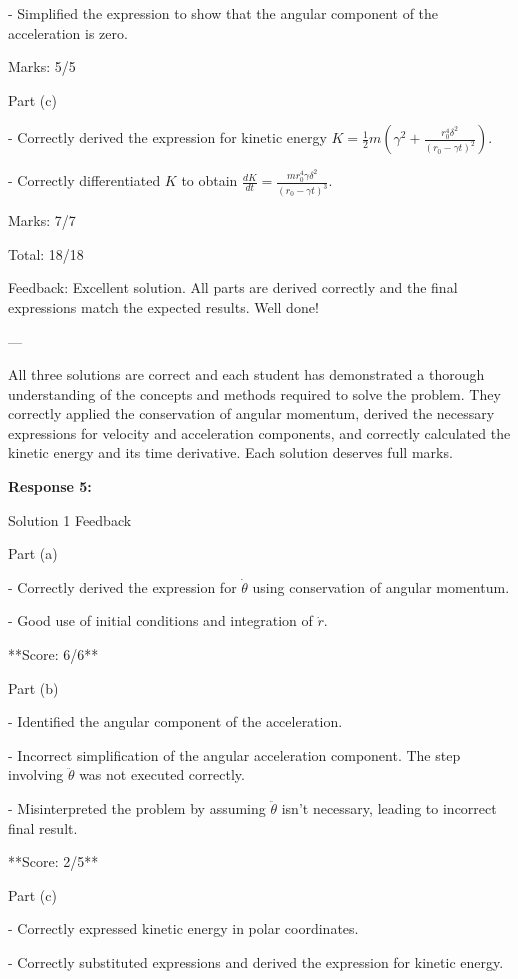 \documentclass[a4paper,11pt]{article}
\begin{document}
- Simplified the expression to show that the angular component of the acceleration is zero.

Marks: 5/5

Part (c)

- Correctly derived the expression for kinetic energy \( K = \frac{1}{2}m (\gamma^2 + \frac{r_0^4 \delta^2}{(r_0 - \gamma t)^2}) \).

- Correctly differentiated \( K \) to obtain \( \frac{dK}{dt} = \frac{m r_0^4 \gamma \delta^2}{(r_0 - \gamma t)^3} \).

Marks: 7/7

Total: 18/18

Feedback: Excellent solution. All parts are derived correctly and the final expressions match the expected results. Well done!

---

All three solutions are correct and each student has demonstrated a thorough understanding of the concepts and methods required to solve the problem. They correctly applied the conservation of angular momentum, derived the necessary expressions for velocity and acceleration components, and correctly calculated the kinetic energy and its time derivative. Each solution deserves full marks.

\bigskip
\textbf{Response 5:}

Solution 1 Feedback

Part (a)

- Correctly derived the expression for \(\dot{\theta}\) using conservation of angular momentum.

- Good use of initial conditions and integration of \(\dot{r}\).

**Score: 6/6**

Part (b)

- Identified the angular component of the acceleration.

- Incorrect simplification of the angular acceleration component. The step involving \(\ddot{\theta}\) was not executed correctly.

- Misinterpreted the problem by assuming \(\ddot{\theta}\) isn't necessary, leading to incorrect final result.

**Score: 2/5**

Part (c)

- Correctly expressed kinetic energy in polar coordinates.

- Correctly substituted expressions and derived the expression for kinetic energy.
\end{document}
